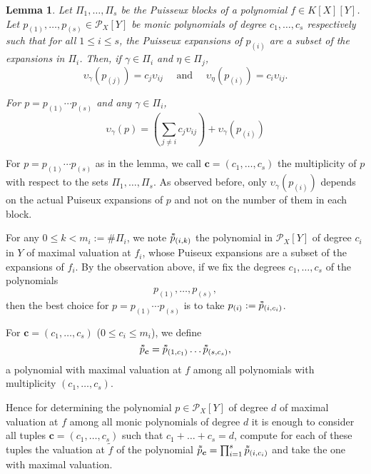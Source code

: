 \documentclass[a4paper,11pt]{amsart}%
\theoremstyle{definition}
\theoremstyle{plain}
\newtheorem{lemma}[defn]{Lemma}
\theoremstyle{remark}
\newcommand{\Px}{{\mathcal{P}_X}}
\newcommand{\vardbtilde}[1]{\tilde{\raisebox{0pt}[0.85\height]{$\tilde{#1}$}}}
\begin{document}
\begin{lemma}
\label{formula:blocks}
Let $\Pi_1, \dots, \Pi_s$ be the Puisseux blocks of a polynomial $f \in K[X][Y]$. Let $p_{(1)}, \dots, p_{(s)} \in \mathcal{P}_{X}[Y]$ be monic polynomials of degree $c_1, \dots, c_s$ respectively such that for all $1 \le i \le s$, the Puisseux expansions of $p_{(i)}$ are a subset of the expansions in $\Pi_i$. Then, if $\gamma \in \Pi_i$ and $\eta \in \Pi_j$,
$$
\upsilon_{\gamma}(p_{(j)}) = c_j \upsilon_{ij} \quad \text{ and } \quad \upsilon_{\eta}(p_{(i)}) = c_i \upsilon_{ij}.
$$

For $p = p_{(1)} \cdots p_{(s)}$ and any $\gamma \in \Pi_i$,
\[
\boxed{
\upsilon_{\gamma}(p) = \left(\textstyle \sum_{j \ne i} c_j \upsilon_{ij}\right) + \upsilon_{\gamma}(p_{(i)})}
\]
\end{lemma}

For $p = p_{(1)} \cdots p_{(s)}$ as in the lemma, we call $\bm{c} = (c_1, \dots, c_s)$ the multiplicity of $p$ with respect to the sets $\Pi_1, \dots, \Pi_s$.
As observed before, only $\upsilon_{\gamma}(p_{(i)})$ depends on the actual Puiseux expansions of $p$ and not on the number of them in each block.

For any $0 \le k < m_i := \#\Pi_i$, we note $\vardbtilde p_{(i, k)}$ the polynomial in $\Px[Y]$ of degree $c_i$ in $Y$ of maximal valuation at $f_i$, whose Puiseux expansions are a subset of the expansions of $f_i$.
By the observation above, if we fix the degrees $c_1, \dots, c_s$ of the polynomials
$$p_{(1)}, \dots, p_{(s)},$$
then the best choice for $p = p_{(1)}\cdots p_{(s)}$ is to take $p_{(i)} := \vardbtilde  p_{(i, c_i)}$.

For $\bm{c} = (c_1, \dots, c_s)$ ($0 \le c_i \le m_i$), we define
$$
\vardbtilde p_{\bm{c}} = \vardbtilde p_{(1, c_1)} \dots \vardbtilde p_{(s, c_s)},
$$
a polynomial with maximal valuation at $f$ among all polynomials with multiplicity $(c_1, \dots, c_s)$.


Hence for determining the polynomial $p \in {\mathcal{P}_{X}}[Y]$ of degree $d$ of maximal valuation at $f$ among all monic polynomials of degree $d$ it is enough to consider all tuples $\bm{c}=(c_1, \dots, c_s)$ such that $c_1 + \dots + c_s = d$, compute for each of these tuples the valuation at $\tilde f$ of the polynomial $\vardbtilde p_{\bm{c}} = \prod_{i=1}^s \vardbtilde p_{(i, c_i)}$ and take the one with maximal valuation.
\end{document}

